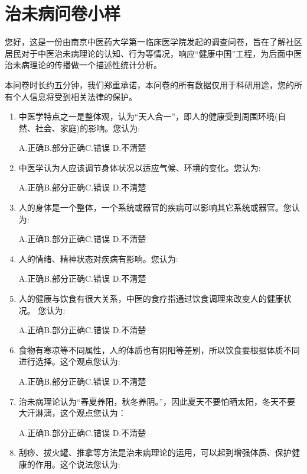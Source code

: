  \section{治未病问卷小样}
您好，这是一份由南京中医药大学第一临床医学院发起的调查问卷，旨在了解社区居民对于中医治未病理论的认知、行为等情况，响应“健康中国”工程，为后面中医治未病理论的传播做一个描述性统计分析。

本问卷时长约五分钟，我们郑重承诺，本问卷的所有数据仅用于科研用途，您的所有个人信息将受到相关法律的保护。

\begin{enumerate}
\item 中医学特点之一是整体观，认为“天人合一”，即人的健康受到周围环境(自然、社会、家庭)的影响。您认为:

A.正确\qquad B.部分正确\qquad C.错误 \qquad D.不清楚

\item 中医学认为人应该调节身体状况以适应气候、环境的变化。您认为:

A.正确\qquad B.部分正确\qquad C.错误 \qquad D.不清楚

\item 人的身体是一个整体，一个系统或器官的疾病可以影响其它系统或器官。您认为:

A.正确\qquad B.部分正确\qquad C.错误 \qquad D.不清楚

\item 人的情绪、精神状态对疾病有影响。您认为:

A.正确\qquad B.部分正确\qquad C.错误 \qquad D.不清楚

\item 人的健康与饮食有很大关系，中医的食疗指通过饮食调理来改变人的健康状况。
您认为:

A.正确\qquad B.部分正确\qquad C.错误 \qquad D.不清楚

\item 食物有寒凉等不同属性，人的体质也有阴阳等差别，所以饮食要根据体质不同进行选择。这个观点您认为:

A.正确\qquad B.部分正确\qquad C.错误 \qquad D.不清楚

\item 治未病理论认为“春夏养阳，秋冬养阴。”，因此夏天不要怕晒太阳，冬天不要大汗淋漓，这个观点您认为：

A.正确\qquad B.部分正确\qquad C.错误 \qquad D.不清楚

\item 刮痧、拔火罐、推拿等方法是治未病理论的运用，可以起到增强体质、保护健康的作用。这个说法您认为:


\end{enumerate}
